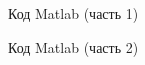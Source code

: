 \documentclass[12pt,a4paper]{scrartcl}
\begin{document}
\begin{figure}[h!]
\caption{Код Matlab (часть 1)}
\end{figure}

\begin{figure}[h!]
\caption{Код Matlab (часть 2)}
\end{figure}
\end{document}
